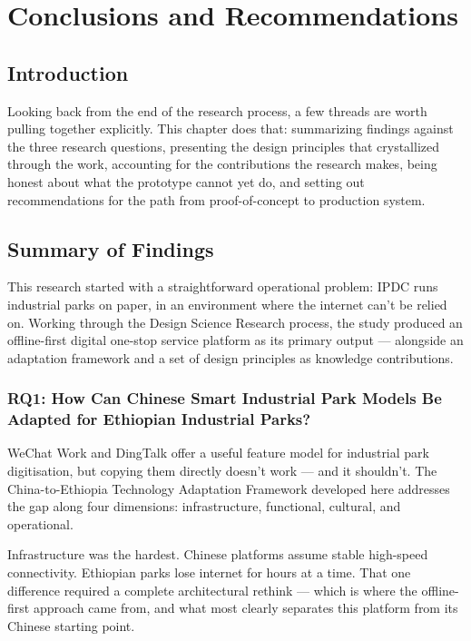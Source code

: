 \chapter{Conclusions and Recommendations}
\label{ch:conclusions}

\section{Introduction}

Looking back from the end of the research process, a few threads are worth pulling together explicitly. This chapter does that: summarizing findings against the three research questions, presenting the design principles that crystallized through the work, accounting for the contributions the research makes, being honest about what the prototype cannot yet do, and setting out recommendations for the path from proof-of-concept to production system.

\section{Summary of Findings}

This research started with a straightforward operational problem: IPDC runs industrial parks on paper, in an environment where the internet can't be relied on. Working through the Design Science Research process, the study produced an offline-first digital one-stop service platform as its primary output --- alongside an adaptation framework and a set of design principles as knowledge contributions.

\subsection{RQ1: How Can Chinese Smart Industrial Park Models Be Adapted for Ethiopian Industrial Parks?}

WeChat Work and DingTalk offer a useful feature model for industrial park digitisation, but copying them directly doesn't work --- and it shouldn't. The China-to-Ethiopia Technology Adaptation Framework developed here addresses the gap along four dimensions: infrastructure, functional, cultural, and operational.

Infrastructure was the hardest. Chinese platforms assume stable high-speed connectivity. Ethiopian parks lose internet for hours at a time. That one difference required a complete architectural rethink --- which is where the offline-first approach came from, and what most clearly separates this platform from its Chinese starting point.

